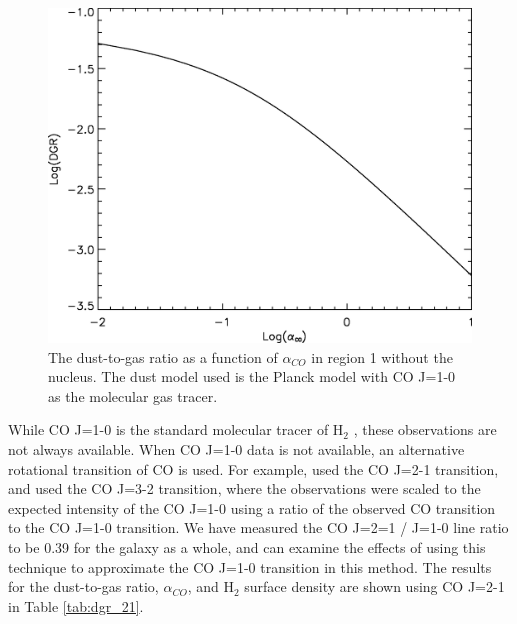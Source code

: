 \begin{figure}
  \centering
  \includegraphics[width=1.\textwidth]{dgr_imgs/region_1-3_aco_dgrf.eps}
  \caption[Mean Dust-to-Gas Ratio vs $\alpha_{CO}$]{The dust-to-gas ratio as a function of $\alpha_{CO}$ in region 1 without the nucleus.  The dust model used is the Planck model with CO J=1-0 as the molecular gas tracer.}
  \label{fig:aco_dgr}
\end{figure}

While CO J=1-0 is the standard molecular tracer of H$_2$ \citep{bolatto2013}, these observations are not always available.  When CO J=1-0 data is not available, an alternative rotational transition of CO is used.  For example, \cite{sandstrom2013} used the CO J=2-1 transition, and \cite{warren2010} used the CO J=3-2 transition, where the observations were scaled to the expected intensity of the CO J=1-0 using a ratio of the observed CO transition to the CO J=1-0 transition.  We have measured the CO J=2=1 / J=1-0 line ratio to be 0.39 for the galaxy as a whole, and can examine the effects of using this technique to approximate the CO J=1-0 transition in this method.  The results for the dust-to-gas ratio, $\alpha_{CO}$, and H$_2$ surface density are shown using CO J=2-1 in Table \ref{tab:dgr_21}.

